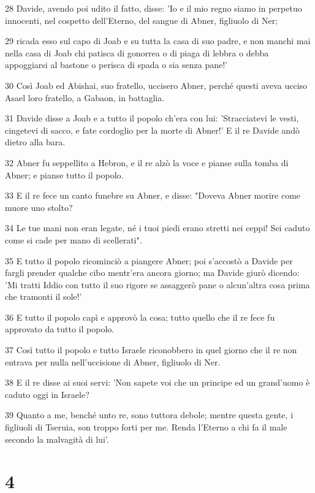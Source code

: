 \par 28 Davide, avendo poi udito il fatto, disse: 'Io e il mio regno siamo in perpetuo innocenti, nel cospetto dell'Eterno, del sangue di Abner, figliuolo di Ner;
\par 29 ricada esso sul capo di Joab e su tutta la casa di suo padre, e non manchi mai nella casa di Joab chi patisca di gonorrea o di piaga di lebbra o debba appoggiarsi al bastone o perisca di spada o sia senza pane!'
\par 30 Così Joab ed Abishai, suo fratello, uccisero Abner, perché questi aveva ucciso Asael loro fratello, a Gabaon, in battaglia.
\par 31 Davide disse a Joab e a tutto il popolo ch'era con lui: 'Stracciatevi le vesti, cingetevi di sacco, e fate cordoglio per la morte di Abner!' E il re Davide andò dietro alla bara.
\par 32 Abner fu seppellito a Hebron, e il re alzò la voce e pianse sulla tomba di Abner; e pianse tutto il popolo.
\par 33 E il re fece un canto funebre su Abner, e disse: "Doveva Abner morire come muore uno stolto?
\par 34 Le tue mani non eran legate, né i tuoi piedi erano stretti nei ceppi! Sei caduto come si cade per mano di scellerati".
\par 35 E tutto il popolo ricominciò a piangere Abner; poi s'accostò a Davide per fargli prender qualche cibo mentr'era ancora giorno; ma Davide giurò dicendo: 'Mi tratti Iddio con tutto il suo rigore se assaggerò pane o alcun'altra cosa prima che tramonti il sole!'
\par 36 E tutto il popolo capì e approvò la cosa; tutto quello che il re fece fu approvato da tutto il popolo.
\par 37 Così tutto il popolo e tutto Israele riconobbero in quel giorno che il re non entrava per nulla nell'uccisione di Abner, figliuolo di Ner.
\par 38 E il re disse ai suoi servi: 'Non sapete voi che un principe ed un grand'uomo è caduto oggi in Israele?
\par 39 Quanto a me, benché unto re, sono tuttora debole; mentre questa gente, i figliuoli di Tseruia, son troppo forti per me. Renda l'Eterno a chi fa il male secondo la malvagità di lui'.

\chapter{4}


